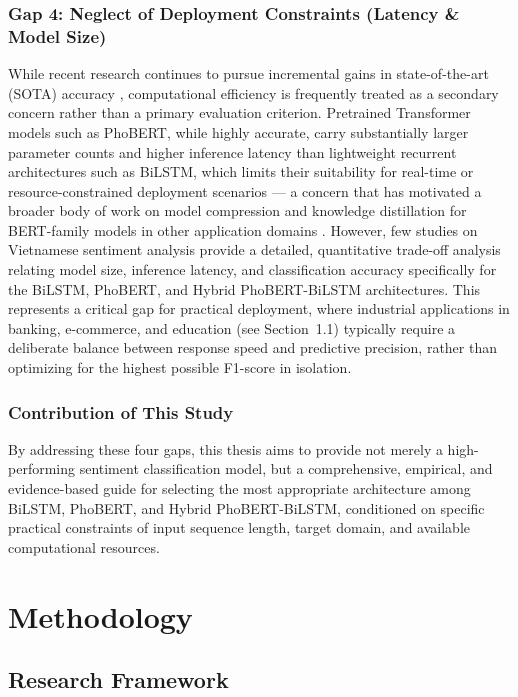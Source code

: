 \documentclass[12pt]{report} %
\begin{document}
\subsection*{Gap 4: Neglect of Deployment Constraints (Latency \& Model Size)}

While recent research continues to pursue incremental gains in state-of-the-art (SOTA) accuracy \cite{wankhade2022survey}, computational efficiency is frequently treated as a secondary concern rather than a primary evaluation criterion. Pretrained Transformer models such as PhoBERT, while highly accurate, carry substantially larger parameter counts and higher inference latency than lightweight recurrent architectures such as BiLSTM, which limits their suitability for real-time or resource-constrained deployment scenarios --- a concern that has motivated a broader body of work on model compression and knowledge distillation for BERT-family models in other application domains \cite{bert2dnn2020}. However, few studies on Vietnamese sentiment analysis provide a detailed, quantitative trade-off analysis relating model size, inference latency, and classification accuracy specifically for the BiLSTM, PhoBERT, and Hybrid PhoBERT-BiLSTM architectures. This represents a critical gap for practical deployment, where industrial applications in banking, e-commerce, and education (see Section~1.1) typically require a deliberate balance between response speed and predictive precision, rather than optimizing for the highest possible F1-score in isolation.

\subsection*{Contribution of This Study}

By addressing these four gaps, this thesis aims to provide not merely a high-performing sentiment classification model, but a comprehensive, empirical, and evidence-based guide for selecting the most appropriate architecture among BiLSTM, PhoBERT, and Hybrid PhoBERT-BiLSTM, conditioned on specific practical constraints of input sequence length, target domain, and available computational resources.

\chapter{Methodology}

\section{Research Framework}
\end{document}
